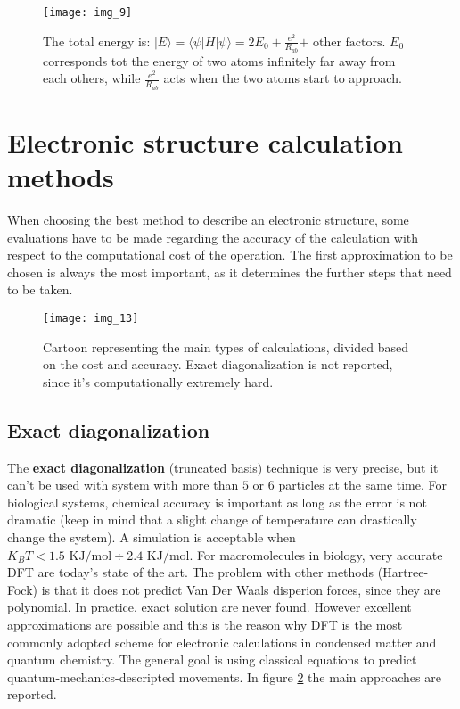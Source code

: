 	\begin{figure}[htbp!]
		\centering
		\texttt{[image: img\_9]}
		\caption{The total energy is: $|E \rangle = \langle \psi | H | \psi \rangle = 2E_0 + \frac{e^2}{R_{ab}} \text{+ other factors}$.
							$E_0$ corresponds tot the energy of two atoms infinitely far away from each others, while $\frac{e^2}{R_{ab}}$ acts when the two atoms start to approach.}
		\label{fig:variational}
	\end{figure}

\section{Electronic structure calculation methods}
When choosing the best method to describe an electronic structure, some evaluations have to be made regarding the accuracy of the calculation with respect to the computational cost of the operation.
The first approximation to be chosen is always the most important, as it determines the further steps that need to be taken.

\begin{figure}[htbp!]
	\centering
	\texttt{[image: img\_13]}
	\caption{Cartoon representing the main types of calculations, divided based on the cost and accuracy. Exact diagonalization is not reported, since it's computationally extremely hard.}
\label{fig:calculations}
\end{figure}

	\subsection{Exact diagonalization}
	The \textbf{exact diagonalization} (truncated basis) technique is very precise, but it can't be used with system with more than $5$ or $6$ particles at the same time.
	For biological systems, chemical accuracy is important as long as the error is not dramatic (keep in mind that a slight change of temperature can drastically change the system). A simulation is acceptable when $K_BT < 1.5\text{ KJ/mol} \div 2.4 \text{ KJ/mol}$.
	For macromolecules in biology, very accurate DFT are today's state of the art. The problem with other methods (Hartree-Fock) is that it does not predict Van Der Waals disperion forces, since they are polynomial.
	In practice, exact solution are never found. However excellent approximations are possible and this is the reason why DFT is the most commonly adopted scheme for electronic calculations in condensed matter and quantum chemistry.
	The general goal is using classical equations to predict quantum-mechanics-descripted movements. In figure \ref{fig:calculations} the main approaches are reported.

